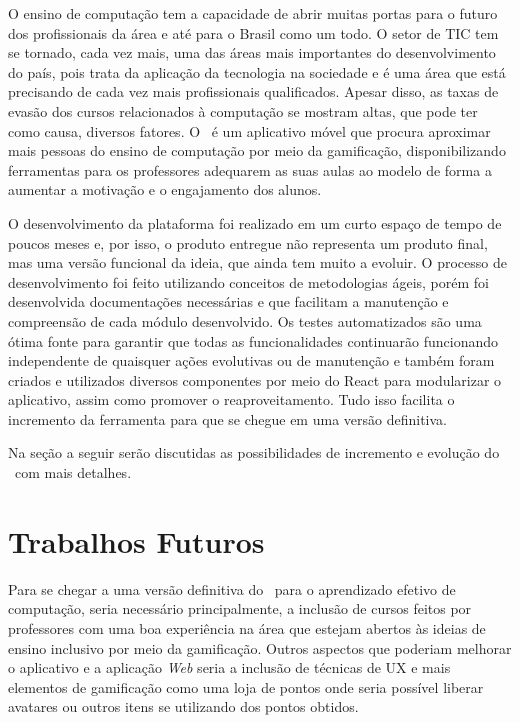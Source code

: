 O ensino de computação tem a capacidade de abrir muitas portas para o futuro dos profissionais da área e até para o Brasil como um todo. O setor de TIC tem se tornado, cada vez mais, uma das áreas mais importantes do desenvolvimento do país, pois trata da aplicação da tecnologia na sociedade e é uma área que está precisando de cada vez mais profissionais qualificados. Apesar disso, as taxas de evasão dos cursos relacionados à computação se mostram altas, que pode ter como causa, diversos fatores. O \appName\ é um aplicativo móvel que procura aproximar mais pessoas do ensino de computação por meio da gamificação, disponibilizando ferramentas para os professores adequarem as suas aulas ao modelo de forma a aumentar a motivação e o engajamento dos alunos.


O desenvolvimento da plataforma foi realizado em um curto espaço de tempo de poucos meses e, por isso, o produto entregue não representa um produto final, mas uma versão funcional da ideia, que ainda tem muito a evoluir. O processo de desenvolvimento foi feito utilizando conceitos de metodologias ágeis, porém foi desenvolvida documentações necessárias e que facilitam a manutenção e compreensão de cada módulo desenvolvido. Os testes automatizados são uma ótima fonte para garantir que todas as funcionalidades continuarão funcionando independente de quaisquer ações evolutivas ou de manutenção e também foram criados e utilizados diversos componentes por meio do React para modularizar o aplicativo, assim como promover o reaproveitamento. Tudo isso facilita o incremento da ferramenta para que se chegue em uma versão definitiva.

Na seção a seguir serão discutidas as possibilidades de incremento e evolução do \appName\ com mais detalhes.

\section{Trabalhos Futuros}

Para se chegar a uma versão definitiva do \appName\ para o aprendizado efetivo de computação, seria necessário principalmente, a inclusão de cursos feitos por professores com uma boa experiência na área que estejam abertos às ideias de ensino inclusivo por meio da gamificação. Outros aspectos que poderiam melhorar o aplicativo e a aplicação \textit{Web} seria a inclusão de técnicas de UX e mais elementos de gamificação como uma loja de pontos onde seria possível liberar avatares ou outros itens se utilizando dos pontos obtidos.
